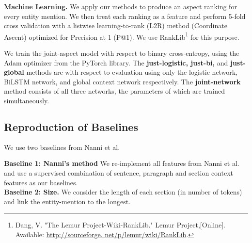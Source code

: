 \textbf{Machine Learning.}
We apply our methods to produce an aspect ranking for every entity mention. We then treat each ranking as a feature and perform 5-fold cross validation with a listwise learning-to-rank (L2R) method (Coordinate Ascent) optimized for Precision at 1 (P@1). We use RankLib\footnote{Dang, V. "The Lemur Project-Wiki-RankLib." Lemur Project,[Online]. Available: \url{http://sourceforge. net/p/lemur/wiki/RankLib}.} for this purpose. 


We train the joint-aspect model with respect to binary cross-entropy, using the Adam optimizer from the PyTorch library. 
The \textbf{just-logistic, just-bi,} and \textbf{just-global} methods are with respect to evaluation using only the logistic network, BiLSTM network, and  global context network respectively. The \textbf{joint-network} method consists of all three networks, the parameters of which are trained simultaneously.

\subsection{Reproduction of Baselines}
\label{subsec:Baselines}
\label{subsubsec:Reproduction of Nanni et al}
We use two baselines from Nanni et al.

\textbf{Baseline 1: Nanni's method} We re-implement all features from Nanni et al. \cite{nanni2018entity} and use a supervised combination of sentence, paragraph and section context features as our baselines. \\
\textbf{Baseline 2: Size.} We consider the length of each section (in number of tokens) and link the entity-mention to the longest. \\


